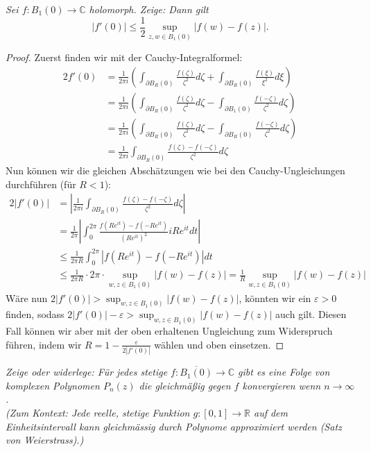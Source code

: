 \documentclass[11pt]{article}
\newcommand{\R}{\mathbb{R}}
\newcommand{\C}{\mathbb{C}}
\newenvironment{problem}[2][Beispiel]{
    \begin{trivlist}
        \item[\hskip \labelsep {\bfseries #1}\hskip \labelsep {\bfseries #2.}] \itshape}{
    \end{trivlist}\normalshape
}
\begin{document}
    \begin{problem}{3}
        Sei $f: B_1(0)\to\C$ holomorph. Zeige: Dann gilt
        $$|f'(0)|\leq \frac{1}{2}\sup_{z,w\in B_1(0)} |f(w)-f(z)|.$$
    \end{problem}

    \begin{proof}
        Zuerst finden wir mit der Cauchy-Integralformel:
        $$\begin{aligned}
              2 f'(0) &= \frac{1}{2\pi i}\left(\int_{\partial B_R(0)}\frac{f(\zeta)}{\zeta^2}d\zeta
              +\int_{\partial B_R(0)}\frac{f(\xi)}{\xi^2}d\xi\right)\\
              &= \frac{1}{2\pi i}\left(\int_{\partial B_R(0)}\frac{f(\zeta)}{\zeta^2}d\zeta
              -\int_{\partial B_1(0)}\frac{f(-\zeta)}{\zeta^2}d\zeta\right)\\
              &= \frac{1}{2\pi i}\left(\int_{\partial B_R(0)}\frac{f(\zeta)}{\zeta^2}d\zeta
              -\int_{\partial B_R(0)}\frac{f(-\zeta)}{\zeta^2}d\zeta\right)\\
              &= \frac{1}{2\pi i}\int_{\partial B_R(0)}\frac{f(\zeta)-f(-\zeta)}{\zeta^2}d\zeta
        \end{aligned}$$
        Nun können wir die gleichen Abschätzungen wie bei den Cauchy-Ungleichungen durchführen (für $R<1$):
        $$\begin{aligned}
              2|f'(0)|
              &= \left|\frac{1}{2\pi i}\int_{\partial B_R(0)}\frac{f(\zeta)-f(-\zeta)}{\zeta^2}d\zeta\right|\\
              &= \frac{1}{2\pi}\left|\int_{0}^{2\pi}\frac{f(Re^{it})-f(-Re^{it})}{(Re^{it})^2}iRe^{it}dt\right|\\
              &\leq \frac{1}{2\pi R}\int_{0}^{2\pi}\left|f(Re^{it})-f(-Re^{it})\right|dt\\
              &\leq \frac{1}{2\pi R}\cdot 2\pi \cdot \sup_{w,z\in B_1(0)}|f(w)-f(z)| = \frac{1}{R}\sup_{w,z\in B_1(0)}|f(w)-f(z)|
        \end{aligned}$$
        Wäre nun $2|f'(0)|>\sup_{w,z\in B_1(0)}|f(w)-f(z)|$, könnten wir ein $\varepsilon>0$ finden, sodass
        $2|f'(0)|-\varepsilon>\sup_{w,z\in B_1(0)}|f(w)-f(z)|$ auch gilt. Diesen Fall können wir
        aber mit der oben erhaltenen Ungleichung zum Widerspruch führen, indem wir
        $R = 1- \frac{\varepsilon}{2|f'(0)|}$ wählen und oben einsetzen.
    \end{proof}

    \begin{problem}{4}
        Zeige oder widerlege: Für jedes stetige $f: \overline{B_1(0)}\to\C$ gibt es eine Folge von
        komplexen Polynomen $P_n(z)$ die gleichmäßig gegen $f$ konvergieren wenn $n\to\infty$.\\
        (Zum Kontext: Jede reelle, stetige Funktion $g : [0, 1] \to \R$ auf dem Einheitsintervall kann
        gleichmässig durch Polynome approximiert werden (Satz von Weierstrass).)
    \end{problem}
\end{document}
